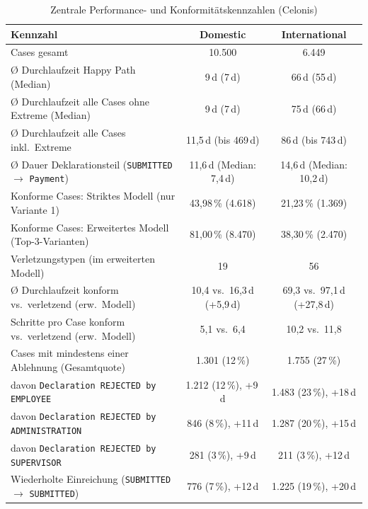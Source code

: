 \begin{table}[htbp]
\centering
\caption{Zentrale Performance- und Konformitätskennzahlen (Celonis)}
\label{tab:kpi_comparison}
\small
\begin{tabular*}{\textwidth}{@{\extracolsep{\fill}} l c c @{}}
\toprule
\textbf{Kennzahl} & \textbf{Domestic} & \textbf{International} \\ \midrule
Cases gesamt & 10.500 & 6.449 \\
Ø Durchlaufzeit Happy Path (Median) & 9\,d (7\,d) & 66\,d (55\,d) \\
Ø Durchlaufzeit alle Cases ohne Extreme (Median) & 9\,d (7\,d) & 75\,d (66\,d) \\
Ø Durchlaufzeit alle Cases inkl.\ Extreme & 11,5\,d (bis 469\,d) & 86\,d (bis 743\,d) \\
Ø Dauer Deklarationsteil (\texttt{SUBMITTED} $\rightarrow$ \texttt{Payment}) & 11,6\,d (Median: 7,4\,d) & 14,6\,d (Median: 10,2\,d) \\
Konforme Cases: Striktes Modell (nur Variante 1) & 43,98\,\% (4.618) & 21,23\,\% (1.369) \\
Konforme Cases: Erweitertes Modell (Top-3-Varianten) & 81,00\,\% (8.470) & 38,30\,\% (2.470) \\
Verletzungstypen (im erweiterten Modell) & 19 & 56 \\
Ø Durchlaufzeit konform vs.\ verletzend (erw.\ Modell) & 10,4 vs.\ 16,3\,d (+5,9\,d) & 69,3 vs.\ 97,1\,d (+27,8\,d) \\
Schritte pro Case konform vs.\ verletzend (erw.\ Modell) & 5,1 vs.\ 6,4 & 10,2 vs.\ 11,8 \\
Cases mit mindestens einer Ablehnung (Gesamtquote) & 1.301 (12\,\%) & 1.755 (27\,\%) \\
\quad davon \texttt{Declaration REJECTED by EMPLOYEE} & 1.212 (12\,\%), +9\,d & 1.483 (23\,\%), +18\,d \\
\quad davon \texttt{Declaration REJECTED by ADMINISTRATION} & 846 (8\,\%), +11\,d & 1.287 (20\,\%), +15\,d \\
\quad davon \texttt{Declaration REJECTED by SUPERVISOR} & 281 (3\,\%), +9\,d & 211 (3\,\%), +12\,d \\
Wiederholte Einreichung (\texttt{SUBMITTED} $\rightarrow$ \texttt{SUBMITTED}) & 776 (7\,\%), +12\,d & 1.225 (19\,\%), +20\,d \\ \bottomrule
\end{tabular*}
\end{table}

